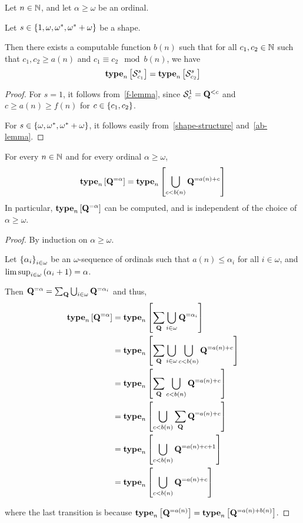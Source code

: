 \begin{corollary}\label{s-alpha-finite}
    Let $n \in \mathbb{N}$, and let $\alpha \ge \omega$ be an ordinal.

    Let $s \in \left\{ {1, \omega, \omega^\ast, \omega^\ast + \omega} \right\}$ be a shape.

    Then there exists a computable function $b(n)$ such that
    for all $c_1, c_2 \in \mathbb{N}$ such that $c_1, c_2 \ge a(n)$ and $c_1 \equiv c_2 \mod b(n)$,
    we have
    \[\mathbf{type}_{n} \left[ {\mathcal{S}^{s}_{c_1}} \right] = \mathbf{type}_{n} \left[ {\mathcal{S}^{s}_{c_2}} \right]\]
\end{corollary}

\begin{proof}
    For $s = 1$, it follows from~\cref{f-lemma},
    since $\mathcal{S}^{1}_{c} = \mathbf{Q}^{< c}$
    and $c \ge a(n) \ge f(n)$ for $c \in \left\{ {c_1, c_2} \right\}$.

    For $s \in \left\{ {\omega, \omega^\ast, \omega^\ast + \omega} \right\}$, it follows easily from~\cref{shape-structure}
    and~\cref{ab-lemma}.
\end{proof}

\begin{lemma}
    For every $n \in \mathbb{N}$ and for every ordinal $\alpha \ge \omega$,
    \[
        \mathbf{type}_{n} \left[ {\mathbf{Q}^{= \alpha}} \right] = \mathbf{type}_{n} \left[ {\bigcup_{c < b(n)}{\mathbf{Q}^{= a(n) + c}}} \right]
    \]
    In particular, $\mathbf{type}_{n} \left[ {\mathbf{Q}^{= \alpha}} \right]$ can be computed,
    and is independent of the choice of $\alpha \ge \omega$.
\end{lemma}

\begin{proof}
    By induction on $\alpha \ge \omega$.

    Let $\left\{ {\alpha_i} \right\}_{i \in \omega}$ be an $\omega$-sequence of ordinals
    such that $a(n) \le \alpha_i$ for all $i \in \omega$,
    and $\limsup_{i \in \omega} \left( {\alpha_i + 1} \right) = \alpha$.

    Then $\mathbf{Q}^{= \alpha} = \sum_{\mathbf{Q}}{\bigcup_{i \in \omega} \mathbf{Q}^{= \alpha_i}}$ and thus,
    \begin{align*}
        \mathbf{type}_{n} \left[ {\mathbf{Q}^{= \alpha}} \right]
        &= \mathbf{type}_{n} \left[ {\sum_{\mathbf{Q}} \bigcup_{i \in \omega} \mathbf{Q}^{= \alpha_i}} \right] \\
        &= \mathbf{type}_{n} \left[ {\sum_{\mathbf{Q}} \bigcup_{i \in \omega} \bigcup_{c < b(n)}{\mathbf{Q}^{= a(n) + c}}} \right] \\
        &= \mathbf{type}_{n} \left[ {\sum_{\mathbf{Q}} \bigcup_{c < b(n)}{\mathbf{Q}^{= a(n) + c}}} \right] \\
        &= \mathbf{type}_{n} \left[ {\bigcup_{c < b(n)}{\sum_{\mathbf{Q}} \mathbf{Q}^{= a(n) + c}}} \right] \\
        &= \mathbf{type}_{n} \left[ {\bigcup_{c < b(n)}{\mathbf{Q}^{= a(n) + c + 1}}} \right] \\
        &= \mathbf{type}_{n} \left[ {\bigcup_{c < b(n)}{\mathbf{Q}^{= a(n) + c}}} \right]
    \end{align*}

    where the last transition is because $\mathbf{type}_{n} \left[ {\mathbf{Q}^{= a(n)}} \right] = \mathbf{type}_{n} \left[ {\mathbf{Q}^{= a(n) + b(n)}} \right]$.
\end{proof}


